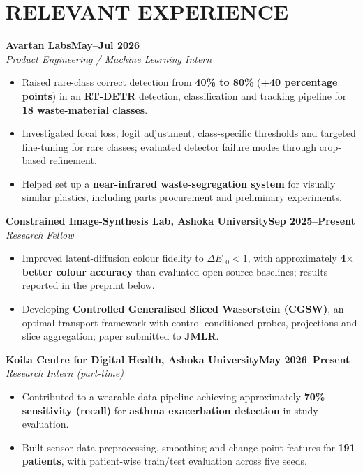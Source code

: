 \documentclass[10pt,a4paper]{article}
\newcommand{\entry}[3]{\noindent\textbf{#1}\hfill\textbf{#3}\\[-1pt]\textit{#2}\par}
\newenvironment{cvitems}{\begin{itemize}[leftmargin=1.1em,label=\textbullet,itemsep=2pt,topsep=3pt,parsep=0pt,partopsep=0pt]}{\end{itemize}}
\begin{document}
\section{RELEVANT EXPERIENCE}
\entry{Avartan Labs}{Product Engineering / Machine Learning Intern}{May--Jul 2026}
\begin{cvitems}
  \item Raised rare-class correct detection from \textbf{40\% to 80\%} (\textbf{+40 percentage points}) in an \textbf{RT-DETR} detection, classification and tracking pipeline for \textbf{18 waste-material classes}.
  \item Investigated focal loss, logit adjustment, class-specific thresholds and targeted fine-tuning for rare classes; evaluated detector failure modes through crop-based refinement.
  \item Helped set up a \textbf{near-infrared waste-segregation system} for visually similar plastics, including parts procurement and preliminary experiments.
\end{cvitems}
\entry{Constrained Image-Synthesis Lab, Ashoka University}{Research Fellow}{Sep 2025--Present}
\begin{cvitems}
  \item Improved latent-diffusion colour fidelity to $\Delta E_{00}<1$, with approximately \textbf{4$\times$ better colour accuracy} than evaluated open-source baselines; results reported in the preprint below.
  \item Developing \textbf{Controlled Generalised Sliced Wasserstein (CGSW)}, an optimal-transport framework with control-conditioned probes, projections and slice aggregation; paper submitted to \textbf{JMLR}.
\end{cvitems}
\entry{Koita Centre for Digital Health, Ashoka University}{Research Intern (part-time)}{May 2026--Present}
\begin{cvitems}
  \item Contributed to a wearable-data pipeline achieving approximately \textbf{70\% sensitivity (recall)} for \textbf{asthma exacerbation detection} in study evaluation.
  \item Built sensor-data preprocessing, smoothing and change-point features for \textbf{191 patients}, with patient-wise train/test evaluation across five seeds.
\end{cvitems}
\end{document}
